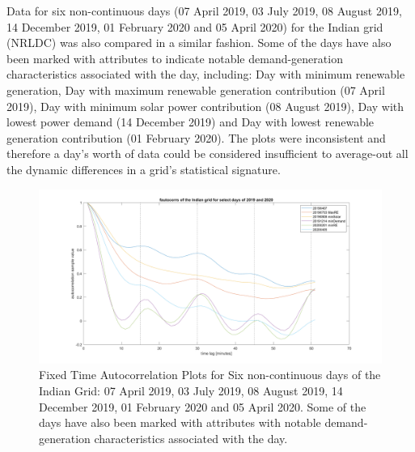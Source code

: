 Data for six non-continuous days (07 April 2019, 03 July 2019, 08 August 2019, 14 December 2019, 01 February 2020 and 05 April 2020) for the Indian grid (NRLDC) was also compared in a similar fashion. Some of the days have also been marked with attributes to indicate notable demand-generation characteristics associated with the day, including: Day with minimum renewable generation, Day with maximum renewable generation contribution (07 April 2019), Day with minimum solar power contribution (08 August 2019), Day with lowest power demand (14 December 2019) and Day with lowest renewable generation contribution (01 February 2020). The plots were inconsistent and therefore a day's worth of data could be considered insufficient to average-out all the dynamic differences in a grid's statistical signature.

\begin{figure}[!ht]
	\includegraphics[scale=0.25]{../figures/autocorr/fautocorrs_nrldc_201904_to_202004}
	\caption{Fixed Time Autocorrelation Plots for Six non-continuous days of the Indian Grid: 07 April 2019, 03 July 2019, 08 August 2019, 14 December 2019, 01 February 2020 and 05 April 2020. Some of the days have also been marked with attributes with notable demand-generation characteristics associated with the day.}
\end{figure}

